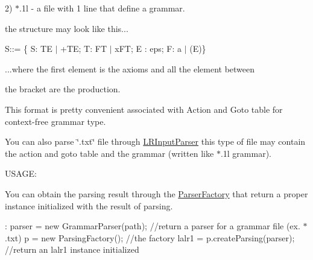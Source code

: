 2) $\ast$.1l -\/ a file with 1 line that define a grammar.\par
 the structure may look like this...\par
 S\-:\-:= \{ S\-: T\-E $|$ +\-T\-E; T\-: F\-T $|$ x\-F\-T; E \-: eps; F\-: a $|$ (E)\}\par
 ...where the first element is the axioms and all the element between\par
 the bracket are the production.\par
 This format is pretty convenient associated with Action and Goto table for context-\/free grammar type.\par


You can also parse \char`\"{}.\-txt\char`\"{} file through \hyperlink{classinput_parser_1_1_l_r_input_parser}{L\-R\-Input\-Parser} this type of file may contain the action and goto table and the grammar (written like $\ast$.1l grammar).\par


U\-S\-A\-G\-E\-:\par
 You can obtain the parsing result through the \hyperlink{classinput_parser_1_1_parser_factory}{Parser\-Factory} that return a proper instance initialized with the result of parsing.\par
 \-:  parser = new Grammar\-Parser(path); //return a parser for a grammar file (ex. $\ast$.txt)  p = new Parsing\-Factory(); //the factory  lalr1 = p.\-create\-Parsing(parser); //return an lalr1 instance initialized 